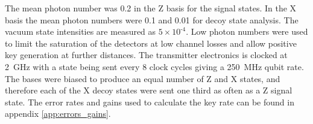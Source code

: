 The mean photon number was 0.2 in the Z basis for the signal states. In the X basis the mean photon numbers were 0.1 and 0.01 for decoy state analysis. The vacuum state intensities are measured as $\text{5}\times \text{10}^\text{-4}$. Low photon numbers were used to limit the saturation of the detectors at low channel losses and allow positive key generation at further distances. The transmitter electronics is clocked at \SI{2}{GHz} with a state being sent every 8 clock cycles giving a \SI{250}{MHz} qubit rate. The bases were biased to produce an equal number of Z and X states, and therefore each of the X decoy states were sent one third as often as a Z signal state. The error rates and gains used to calculate the key rate can be found in appendix \ref{app:errors_gains}.

%
%

%


